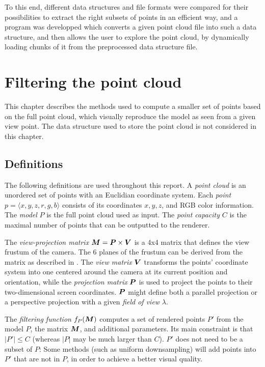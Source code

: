 \documentclass[a4paper,10pt,abstracton,notitlepage]{scrreprt}
\begin{document}
To this end, different data structures and file formats were compared for their possibilities to extract the right subsets of points in an efficient way, and a program was developped which converts a given point cloud file into such a data structure, and then allows the user to explore the point cloud, by dynamically loading chunks of it from the preprocessed data structure file.


\chapter{Filtering the point cloud}
This chapter describes the methods used to compute a smaller set of points based on the full point cloud, which visually reproduce the model as seen from a given view point. The data structure used to store the point cloud is not considered in this chapter.

\section{Definitions}
The following definitions are used throughout this report. A \emph{point cloud} is an unordered set of points with an Euclidian coordinate system. Each \emph{point} $p = \langle x, y, z, r, g, b\rangle$ consists of its coordinates $x, y, z$, and RGB color information. The \emph{model} $P$ is the full point cloud used as input. The \emph{point capacity} $C$ is the maximal number of points that can be outputted to the renderer. 

The \emph{view-projection matrix} $\matrixsym{M} = \matrixsym{P} \times \matrixsym{V}$ is a 4x4 matrix that defines the view frustum of the camera. The 6 planes of the frustum can be derived from the matrix as described in \cite{Gri2001}. The \emph{view matrix} $\matrixsym{V}$ transforms the points' coordinate system into one centered around the camera at its current position and orientation, while the \emph{projection matrix} $\matrixsym{P}$ is used to project the points to their two-dimensional screen coordinates. $\matrixsym{P}$ might define both a parallel projection or a perspective projection with a given \emph{field of view} $\lambda$.

The \emph{filtering function} $f_{P}(\matrixsym{M})$ computes a set of rendered points $P'$ from the model $P$, the matrix $\matrixsym{M}$, and additional parameters. Its main constraint is that $|P'| \leq C$ (whereas $|P|$ may be much larger than $C$). $P'$ does not need to be a subset of $P$: Some methods (such as uniform downsampling) will add points into $P'$ that are not in $P$, in order to achieve a better visual quality.
\end{document}
